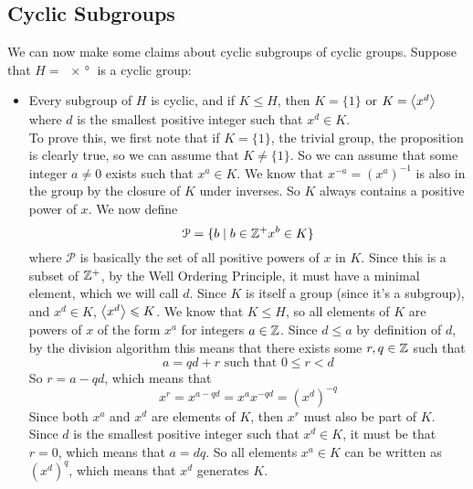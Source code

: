 \documentclass[12pt]{article}
\begin{document}
    \subsection*{Cyclic Subgroups}

    We can now make some claims about cyclic subgroups of
    cyclic groups.
    Suppose that $H = \ang{x}$ is a cyclic group:
    \begin{itemize}[label=$\diamond$]
        \item 
            Every subgroup of $H$ is cyclic,
            and if $K \leqslant H$,
            then $K = \{1\}$
            or $K = \left\langle x^d \right\rangle$
            where $d$ is the smallest positive integer
            such that $x^d \in K$. \\
            To prove this, we first note that
            if $K = \{1\}$, the trivial group,
            the proposition is clearly true,
            so we can assume that $K \neq \{1\}$.
            So we can assume that some integer $a \neq 0$
            exists such that $x^a \in K$.
            We know that $x^{-a} = (x^a)^{-1}$ is also in the group
            by the closure of $K$ under inverses.
            So $K$ always contains a positive power of $x$.
            We now define
            \[ \mathcal{P} = \{ b \mid b \in \mathbb{Z}^+ x^b \in K \} \]
            where $\mathcal{P}$ is basically the set of
            all positive powers of $x$ in $K$.
            Since this is a subset of $\mathbb{Z}^+$,
            by the Well Ordering Principle, 
            it must have a minimal element,
            which we will call $d$.
            Since $K$ is itself a group (since it's a subgroup),
            and $x^d \in K$,
            $\left\langle x^d \right\rangle \leqslant K$.
            We know that $K \leqslant H$,
            so all elements of $K$ are powers of $x$ of the form $x^a$
            for integers $a \in \mathbb{Z}$.
            Since $d \leqslant a$ by definition of $d$,
            by the division algorithm this means that 
            there exists some $r, q \in \mathbb{Z}$ such that
            \[ a = qd + r \text{ such that } 0 \leqslant r < d \]
            So $r = a - qd$,
            which means that
            \[ x^r = x^{a - qd} = x^ax^{-qd} = (x^d)^{-q} \]
            Since both $x^a$ and $x^d$ are elements of $K$,
            then $x^r$ must also be part of $K$.
            Since $d$ is the smallest positive integer
            such that $x^d \in K$,
            it must be that $r = 0$,
            which means that $a = dq$.
            So all elements $x^a \in K$ can be written as $(x^d)^q$,
            which means that $x^d$ generates $K$.

\end{itemize}
\end{document}
